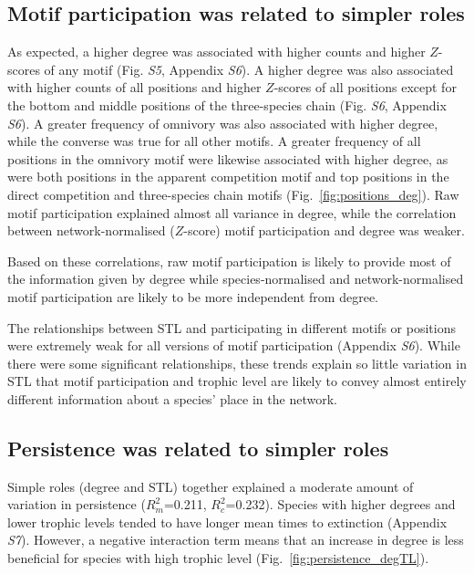 \documentclass[12pt]{article}
\begin{document}
\begin{spacing}{2.0}
    \subsection*{Motif participation was related to simpler roles}    
    
        As expected, a higher degree was associated with higher counts and higher $Z$-scores of any motif (Fig. \emph{S5}, Appendix \emph{S6}).
        A higher degree was also associated with higher counts of all positions and higher $Z$-scores of all positions except for the bottom and middle positions of the three-species chain (Fig. \emph{S6}, Appendix \emph{S6}).
        A greater frequency of omnivory was also associated with higher degree, while the converse was true for all other motifs.
        A greater frequency of all positions in the omnivory motif were likewise associated with higher degree, as were both positions in the apparent competition motif and top positions in the direct competition and three-species chain motifs (Fig.~\ref{fig:positions_deg}).
        Raw motif participation explained almost all variance in degree, while the correlation between network-normalised ($Z$-score) motif participation and degree was weaker.

        Based on these correlations, raw motif participation is likely to provide most of the information given by degree while species-normalised and network-normalised motif participation are likely to be more independent from degree.
        
    
        The relationships between STL and participating in different motifs or positions were extremely weak for all versions of motif participation (Appendix \emph{S6}).
        While there were some significant relationships, these trends explain so little variation in STL that motif participation and trophic level are likely to convey almost entirely different information about a species' place in the network.
    

    \subsection*{Persistence was related to simpler roles}
    
        Simple roles (degree and STL) together explained a moderate amount of variation in persistence ($R^2_m$=0.211, $R^2_c$=0.232).
        Species with higher degrees and lower trophic levels tended to have longer mean times to extinction (Appendix \emph{S7}).
        However, a negative interaction term means that an increase in degree is less beneficial for species with high trophic level (Fig.~\ref{fig:persistence_degTL}).
    

\end{spacing}
\end{document}
